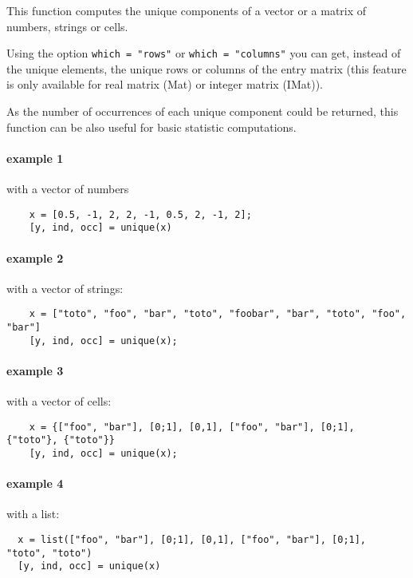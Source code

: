 \begin{mandescription}
  This function computes the unique components of a vector or a matrix of
  numbers, strings or cells.

  Using the option \verb+which = "rows"+ or \verb+which = "columns"+ you can
  get, instead of the unique elements, the unique rows or columns of the entry
  matrix (this feature is only available for real matrix (Mat) or integer matrix
  (IMat)).
  
  As the number of occurrences of each unique component could be returned, this
  function can be also useful for basic statistic computations.
\end{mandescription}
\begin{examples}
  \paragraph{example 1} with a vector of numbers
  \begin{Verbatim}
    x = [0.5, -1, 2, 2, -1, 0.5, 2, -1, 2];
    [y, ind, occ] = unique(x)
  \end{Verbatim}

  \paragraph{example 2} with a vector of strings:
  \begin{Verbatim}
    x = ["toto", "foo", "bar", "toto", "foobar", "bar", "toto", "foo", "bar"]
    [y, ind, occ] = unique(x);
  \end{Verbatim}

  \paragraph{example 3} with a vector of cells:
  \begin{Verbatim}
    x = {["foo", "bar"], [0;1], [0,1], ["foo", "bar"], [0;1], {"toto"}, {"toto"}}
    [y, ind, occ] = unique(x);
\end{Verbatim}

\paragraph{example 4} with a list:
\begin{Verbatim}
  x = list(["foo", "bar"], [0;1], [0,1], ["foo", "bar"], [0;1], "toto", "toto")
  [y, ind, occ] = unique(x)
\end{Verbatim}


\end{examples}
